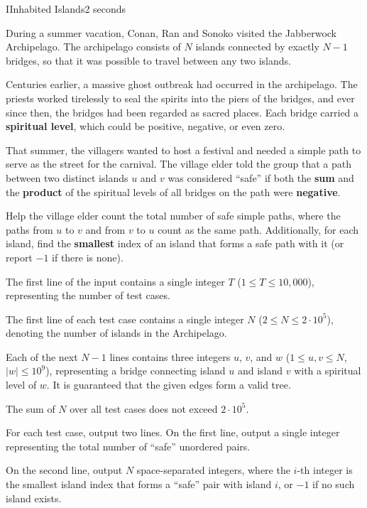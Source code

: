 \begin{problem}{I}{Inhabited Islands}{2 seconds}

\noindent
During a summer vacation, Conan, Ran and Sonoko visited the Jabberwock Archipelago. The archipelago consists of $N$ islands connected by exactly $N-1$ bridges, so that it was possible to travel between any two islands. 

\noindent
Centuries earlier, a massive ghost outbreak had occurred in the archipelago. The priests worked tirelessly to seal the spirits into the piers of the bridges, and ever since then, the bridges had been regarded as sacred places. Each bridge carried a \textbf{spiritual level}, which could be positive, negative, or even zero.

\noindent
That summer, the villagers wanted to host a festival and needed a simple path to serve as the street for the carnival. The village elder told the group that a path between two distinct islands $u$ and $v$ was considered ``safe'' if both the \textbf{sum} and the \textbf{product} of the spiritual levels of all bridges on the path were \textbf{negative}.

\noindent
Help the village elder count the total number of safe simple paths, where the paths from $u$ to $v$ and from $v$ to $u$ count as the same path. Additionally, for each island, find the \textbf{smallest} index of an island that forms a safe path with it (or report $-1$ if there is none).

\InputFile

\noindent
The first line of the input contains a single integer $T$ ($1 \le T \le 10,000$), representing the number of test cases.

\noindent
The first line of each test case contains a single integer $N$ ($2 \le N \le 2 \cdot 10^5$), denoting the number of islands in the Archipelago. 

\noindent
Each of the next $N-1$ lines contains three integers $u$, $v$, and $w$ ($1 \le u, v \le N$, $ |w| \le 10^9$), representing a bridge connecting island $u$ and island $v$ with a spiritual level of $w$. It is guaranteed that the given edges form a valid tree.

\noindent
The sum of $N$ over all test cases does not exceed $2 \cdot 10^5$.

\OutputFile

\noindent
For each test case, output two lines. On the first line, output a single integer representing the total number of ``safe'' unordered pairs.

\noindent
On the second line, output $N$ space-separated integers, where the $i$-th integer is the smallest island index that forms a ``safe'' pair with island $i$, or $-1$ if no such island exists.

\Examples

\begin{example}
\end{example}

\pagebreak

\end{problem}